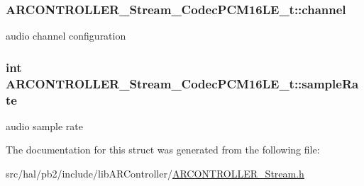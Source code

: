 \subsubsection[{\texorpdfstring{channel}{channel}}]{ A\+R\+C\+O\+N\+T\+R\+O\+L\+L\+E\+R\+\_\+\+Stream\+\_\+\+Codec\+P\+C\+M16\+L\+E\+\_\+t\+::channel}\hypertarget{struct_a_r_c_o_n_t_r_o_l_l_e_r___stream___codec_p_c_m16_l_e__t_a88d62a1b91a2856c2762511e43924035}{}\label{struct_a_r_c_o_n_t_r_o_l_l_e_r___stream___codec_p_c_m16_l_e__t_a88d62a1b91a2856c2762511e43924035}
audio channel configuration 
\subsubsection[{\texorpdfstring{sample\+Rate}{sampleRate}}]{\setlength{\rightskip}{0pt plus 5cm}int A\+R\+C\+O\+N\+T\+R\+O\+L\+L\+E\+R\+\_\+\+Stream\+\_\+\+Codec\+P\+C\+M16\+L\+E\+\_\+t\+::sample\+Rate}\hypertarget{struct_a_r_c_o_n_t_r_o_l_l_e_r___stream___codec_p_c_m16_l_e__t_ac3bafab7a9a5f04c5f76d3bde59ce40a}{}\label{struct_a_r_c_o_n_t_r_o_l_l_e_r___stream___codec_p_c_m16_l_e__t_ac3bafab7a9a5f04c5f76d3bde59ce40a}
audio sample rate 

The documentation for this struct was generated from the following file\+:\begin{DoxyCompactItemize}
\item 
src/hal/pb2/include/lib\+A\+R\+Controller/\hyperlink{_a_r_c_o_n_t_r_o_l_l_e_r___stream_8h}{A\+R\+C\+O\+N\+T\+R\+O\+L\+L\+E\+R\+\_\+\+Stream.\+h}\end{DoxyCompactItemize}
